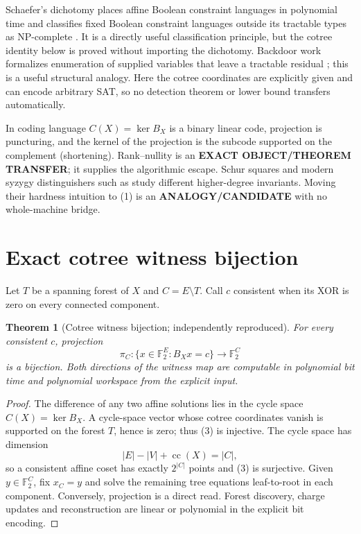 \documentclass[11pt]{article}
\newtheorem{theorem}{Theorem}
\newcommand{\F}{\mathbb F_2}
\begin{document}
Schaefer's dichotomy places affine Boolean constraint languages in polynomial
time and classifies fixed Boolean constraint languages outside its tractable
types as NP-complete \cite{Schaefer}.  It is a directly useful classification
principle, but the cotree identity below is proved without importing the
dichotomy.  Backdoor work formalizes enumeration of supplied variables that
leave a tractable residual \cite{GS}; this is a useful structural analogy.
Here the cotree coordinates are explicitly given and can encode arbitrary SAT,
so no detection theorem or lower bound transfers automatically.

In coding language $C(X)=\ker B_X$ is a binary linear code, projection is
puncturing, and the kernel of the projection is the subcode supported on the
complement (shortening).  Rank--nullity is an \textbf{EXACT OBJECT/THEOREM
TRANSFER}; it supplies the algorithmic escape.  Schur squares and modern
syzygy distinguishers such as \cite{Rand} study different higher-degree
invariants.  Moving their hardness intuition to (1) is an
\textbf{ANALOGY/CANDIDATE} with no whole-machine bridge.

\section{Exact cotree witness bijection}
Let $T$ be a spanning forest of $X$ and $C=E\setminus T$.  Call $c$
consistent when its XOR is zero on every connected component.

\begin{theorem}[Cotree witness bijection; independently reproduced]
For every consistent $c$, projection
\[
 \pi_C:\{x\in\F^E:B_Xx=c\}\longrightarrow\F^C              \tag{3}
\]
is a bijection.  Both directions of the witness map are computable in
polynomial bit time and polynomial workspace from the explicit input.
\end{theorem}
\begin{proof}
The difference of any two affine solutions lies in the cycle space
$C(X)=\ker B_X$.  A cycle-space vector whose cotree coordinates vanish is
supported on the forest $T$, hence is zero; thus (3) is injective.  The cycle
space has dimension
\[
 |E|-|V|+\operatorname{cc}(X)=|C|,
\]
so a consistent affine coset has exactly $2^{|C|}$ points and (3) is
surjective.  Given $y\in\F^C$, fix $x_C=y$ and solve the remaining tree
equations leaf-to-root in each component.  Conversely, projection is a direct
read.  Forest discovery, charge updates and reconstruction are linear or
polynomial in the explicit bit encoding.
\end{proof}
\end{document}
